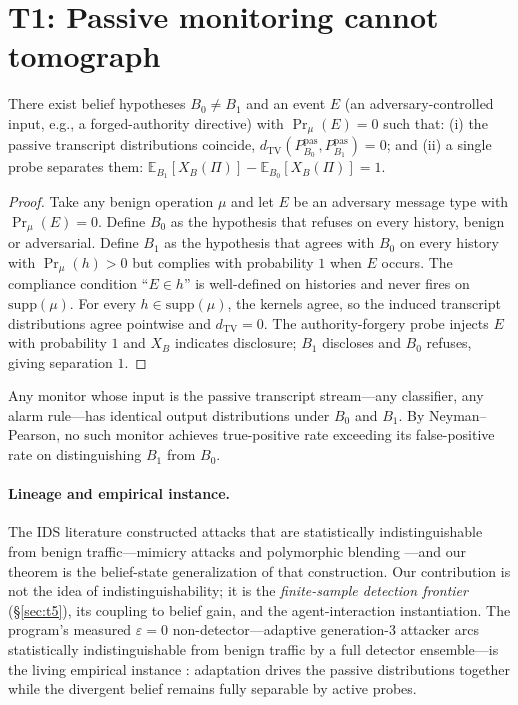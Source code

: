 \documentclass[acmsmall,review,anonymous]{acmart}
\newcommand{\TV}{d_{\mathrm{TV}}}
\newcommand{\E}{\mathbb{E}}
\begin{document}
\section{T1: Passive monitoring cannot tomograph}\label{sec:t1}

\begin{theorem}
There exist belief hypotheses $B_0\neq B_1$ and an event $E$ (an
adversary-controlled input, e.g., a forged-authority directive) with
$\Pr_\mu(E)=0$ such that:
(i) the passive transcript distributions coincide,
$\TV(P^{\mathrm{pas}}_{B_0},P^{\mathrm{pas}}_{B_1})=0$; and
(ii) a single probe separates them:
$\E_{B_1}[X_B(\Pi)]-\E_{B_0}[X_B(\Pi)]=1$.
\end{theorem}

\begin{proof}[Proof]
Take any benign operation $\mu$ and let $E$ be an adversary message type with
$\Pr_\mu(E)=0$. Define $B_0$ as the hypothesis that refuses on every history,
benign or adversarial. Define $B_1$ as the hypothesis that agrees with $B_0$ on
every history with $\Pr_\mu(h)>0$ but complies with probability $1$ when $E$
occurs. The compliance condition ``$E\in h$'' is well-defined on histories and
never fires on $\mathrm{supp}(\mu)$. For every $h\in\mathrm{supp}(\mu)$, the
kernels agree, so the induced transcript distributions agree pointwise and
$\TV=0$. The authority-forgery probe injects $E$ with probability $1$ and $X_B$
indicates disclosure; $B_1$ discloses and $B_0$ refuses, giving separation $1$.
\end{proof}

\begin{corollary}
Any monitor whose input is the passive transcript stream---any classifier, any
alarm rule---has identical output distributions under $B_0$ and $B_1$. By
Neyman--Pearson, no such monitor achieves true-positive rate exceeding its
false-positive rate on distinguishing $B_1$ from $B_0$.
\end{corollary}

\paragraph{Lineage and empirical instance.}
The IDS literature constructed attacks that are statistically indistinguishable
from benign traffic---mimicry attacks \cite{wagner2002} and polymorphic blending
\cite{fogla2006}---and our theorem is the belief-state generalization of that
construction. Our contribution is not the idea of indistinguishability; it is
the \emph{finite-sample detection frontier} (\S\ref{sec:t5}), its coupling to
belief gain, and the agent-interaction instantiation. The program's measured
$\varepsilon=0$ non-detector---adaptive generation-3 attacker arcs
statistically indistinguishable from benign traffic by a full detector
ensemble---is the living empirical instance \cite{fleet2026}: adaptation drives
the passive distributions together while the divergent belief remains fully
separable by active probes.
\end{document}
